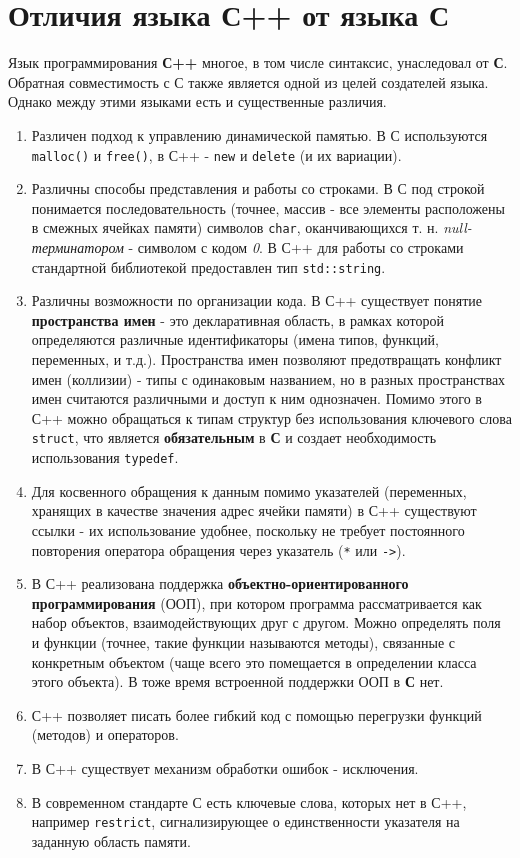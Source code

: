 \section{Отличия языка С++ от языка С}

Язык программирования \textbf{С++} многое, в том числе синтаксис,
унаследовал от \textbf{С}. Обратная совместимость с С также является
одной из целей создателей языка. Однако между этими языками есть и
существенные различия.

\begin{enumerate}
\item
  Различен подход к управлению динамической памятью. В С используются
  \texttt{malloc()} и \texttt{free()}, в С++ - \texttt{new} и
  \texttt{delete} (и их вариации).
\item
  Различны способы представления и работы со строками. В С под строкой
  понимается последовательность (точнее, массив - все элементы
  расположены в смежных ячейках памяти) символов \texttt{char},
  оканчивающихся т. н. \emph{null-терминатором} - символом с кодом
  \emph{0}. В С++ для работы со строками стандартной библиотекой
  предоставлен тип \texttt{std::string}.
\item
  Различны возможности по организации кода. В С++ существует понятие
  \textbf{пространства имен} - это декларативная область, в рамках
  которой определяются различные идентификаторы (имена типов, функций,
  переменных, и т.д.). Пространства имен позволяют предотвращать
  конфликт имен (коллизии) - типы с одинаковым названием, но в разных
  пространствах имен считаются различными и доступ к ним однозначен.
  Помимо этого в С++ можно обращаться к типам структур без использования
  ключевого слова \texttt{struct}, что является \textbf{обязательным} в
  \textbf{С} и создает необходимость использования \texttt{typedef}.
\item
  Для косвенного обращения к данным помимо указателей (переменных,
  хранящих в качестве значения адрес ячейки памяти) в С++ существуют
  ссылки - их использование удобнее, поскольку не требует постоянного
  повторения оператора обращения через указатель (\texttt{*} или
  \texttt{-\textgreater{}}).
\item
  В С++ реализована поддержка \textbf{объектно-ориентированного
  программирования} (ООП), при котором программа рассматривается как
  набор объектов, взаимодействующих друг с другом. Можно определять поля
  и функции (точнее, такие функции называются методы), связанные с
  конкретным объектом (чаще всего это помещается в определении класса
  этого объекта). В тоже время встроенной поддержки ООП в \textbf{С}
  нет.
\item
  С++ позволяет писать более гибкий код с помощью перегрузки функций
  (методов) и операторов.
\item
  В С++ существует механизм обработки ошибок - исключения.
\item
  В современном стандарте С есть ключевые слова, которых нет в С++,
  например \texttt{restrict}, сигнализирующее о единственности указателя
  на заданную область памяти.
\end{enumerate}

